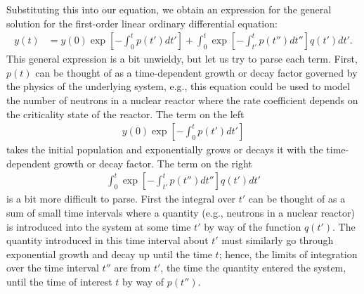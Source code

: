 Substituting this into our equation, we obtain an expression for the general solution for the first-order linear ordinary differential equation:
\begin{align}
   y(t)  &=   y(0)  \exp \left[ -\int_0^{t} p(t') dt' \right]  + \int_0^t \exp \left[ -  \int_{t'}^{t} p(t'') dt'' \right] q(t') dt' .
\end{align}
This general expression is a bit unwieldy, but let us try to parse each term. First, $p(t)$ can be thought of as a time-dependent growth or decay factor governed by the physics of the underlying system, e.g., this equation could be used to model the number of neutrons in a nuclear reactor where the rate coefficient depends on the criticality state of the reactor. The term on the left
\begin{align}
   y(0)  \exp \left[ -\int_0^{t} p(t') dt' \right] \nonumber
\end{align}
takes the initial population and exponentially grows or decays it with the time-dependent growth or decay factor. The term on the right
\begin{align}
   \int_0^t \exp \left[ -  \int_{t'}^{t} p(t'') dt'' \right] q(t') dt' \nonumber
\end{align}
is a bit more difficult to parse. First the integral over $t'$ can be thought of as a sum of small time intervals where a quantity (e.g., neutrons in a nuclear reactor) is introduced into the system at some time $t'$ by way of the function $q(t')$. The quantity introduced in this time interval about $t'$ must similarly go through exponential growth and decay up until the time $t$; hence, the limits of integration over the time interval $t''$ are from $t'$, the time the quantity entered the system, until the time of interest $t$ by way of $p(t'')$.

